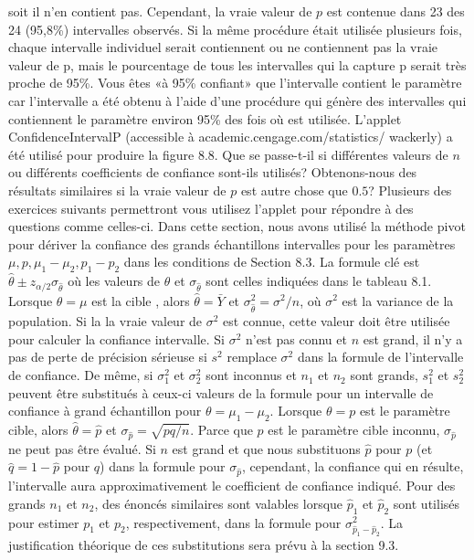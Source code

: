 \documentclass[]{article}
\begin{document}
soit il n'en contient pas. Cependant, la vraie valeur de \(p\) est
contenue dans 23 des 24 (95,8\%) intervalles observés. Si la même
procédure était utilisée plusieurs fois, chaque intervalle individuel
serait contiennent ou ne contiennent pas la vraie valeur de p, mais le
pourcentage de tous les intervalles qui la capture p serait très proche
de 95\%. Vous êtes «à 95\% confiant» que l'intervalle contient le
paramètre car l'intervalle a été obtenu à l'aide d'une procédure qui
génère des intervalles qui contiennent le paramètre environ 95\% des
fois où est utilisée. L'applet ConfidenceIntervalP (accessible à
academic.cengage.com/statistics/ wackerly) a été utilisé pour produire
la figure 8.8. Que se passe-t-il si différentes valeurs de \(n\) ou
différents coefficients de confiance sont-ils utilisés? Obtenons-nous
des résultats similaires si la vraie valeur de \(p\) est autre chose que
\(0.5\)? Plusieurs des exercices suivants permettront vous utilisez
l'applet pour répondre à des questions comme celles-ci. Dans cette
section, nous avons utilisé la méthode pivot pour dériver la confiance
des grands échantillons intervalles pour les paramètres
\(\mu, p,\mu_1-\mu_2, p_1-p_2\) dans les conditions de Section 8.3. La
formule clé est
\(\widehat{\theta} \pm z_{\alpha/2}\sigma_{\widehat{\theta}}\) où les
valeurs de \(\widehat{\theta}\) et \(\sigma_{\widehat{\theta}}\) sont
celles indiquées dans le tableau 8.1. Lorsque \(\theta = \mu\) est la
cible , alors \(\widehat{\theta}= \bar{Y}\) et
\(\sigma^2_{\widehat{\theta}} = \sigma^2/n\), où \(\sigma^2\) est la
variance de la population. Si la la vraie valeur de \(\sigma^2\) est
connue, cette valeur doit être utilisée pour calculer la confiance
intervalle. Si \(\sigma^2\) n'est pas connu et \(n\) est grand, il n'y a
pas de perte de précision sérieuse si \(s^2\) remplace \(\sigma^2\) dans
la formule de l'intervalle de confiance. De même, si \(\sigma^2_1\) et
\(\sigma^2_2\) sont inconnus et \(n_1\) et \(n_2\) sont grands,
\(s^2_1\) et \(s^2_2\) peuvent être substitués à ceux-ci valeurs de la
formule pour un intervalle de confiance à grand échantillon pour
\(\theta = \mu_1 - \mu_2\). Lorsque \(\theta =p\) est le paramètre
cible, alors \(\widehat{\theta} = \widehat{p}\) et
\(\sigma_{\widehat{p}} = \sqrt{pq/n}\). Parce que \(p\) est le paramètre
cible inconnu, \(\sigma_{\widehat{p}}\) ne peut pas être évalué. Si
\(n\) est grand et que nous substituons \(\widehat{p}\) pour \(p\) (et
\(\widehat{q} = 1− \widehat{p}\) pour \(q\)) dans la formule pour
\(\sigma_{\widehat{p}}\), cependant, la confiance qui en résulte,
l'intervalle aura approximativement le coefficient de confiance indiqué.
Pour des grands \(n_1\) et \(n_2\), des énoncés similaires sont valables
lorsque \(\widehat{p}_1\) et \(\widehat{p}_2\) sont utilisés pour
estimer \(p_1\) et \(p_2\), respectivement, dans la formule pour
\(\sigma^2_{\widehat{p}_1 - \widehat{p}_2}\). La justification théorique
de ces substitutions sera prévu à la section 9.3.
\end{document}
